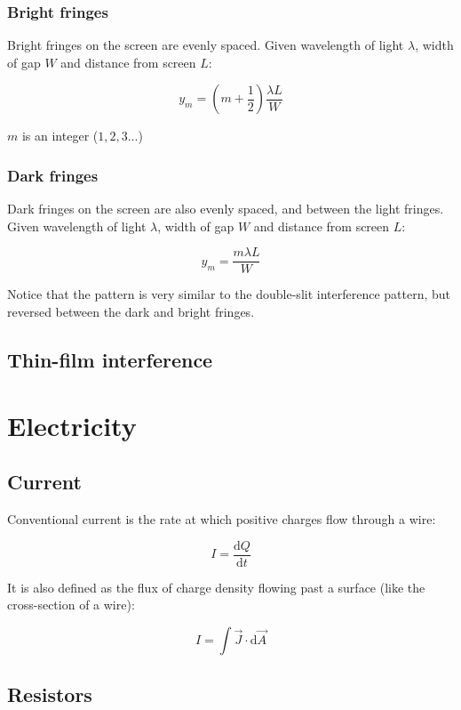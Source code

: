\documentclass[12pt]{article}
\begin{document}
\subsubsection{Bright fringes}

Bright fringes on the screen are evenly spaced.
Given wavelength of light $\lambda$, width of gap $W$ and distance from screen $L$:

\[
\boxed{
y_m = \left(m + \frac{1}{2}\right)\frac{\lambda L}{W}
}
\]

$m$ is an integer ($1, 2, 3 ...$)

\subsubsection{Dark fringes}

Dark fringes on the screen are also evenly spaced, and between the light fringes.
Given wavelength of light $\lambda$, width of gap $W$ and distance from screen $L$:

\[
\boxed{
y_m = \frac{m\lambda L}{W}
}
\]

Notice that the pattern is very similar to the double-slit interference pattern, but reversed between the dark and bright fringes.

\newpage

\subsection{Thin-film interference}

\newpage

\section{Electricity}

\subsection{Current}

Conventional current is the rate at which positive charges flow through a wire:

\[
\boxed{
I = \frac{\mathrm{d}Q}{\mathrm{d}t}
}
\]

It is also defined as the flux of charge density flowing past a surface (like the cross-section of a wire):

\[
\boxed{
I = \int \vec{J} \cdot \mathrm{d}\vec{A}
}
\]

\subsection{Resistors}
\end{document}
